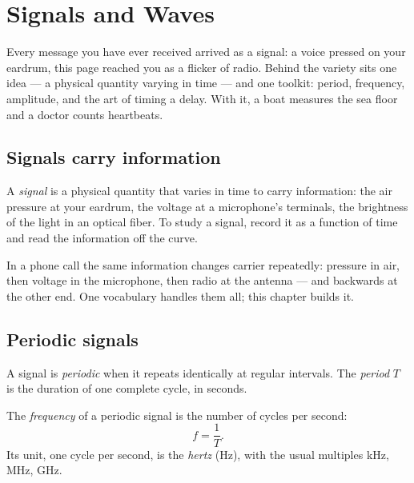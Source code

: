\chapter{Signals and Waves}\label{ch:g10:signals-and-waves}

Every message you have ever received arrived as a signal: a voice pressed
on your eardrum, this page reached you as a flicker of radio. Behind the
variety sits one idea --- a physical quantity varying in time --- and one
toolkit: period, frequency, amplitude, and the art of timing a delay.
With it, a boat measures the sea floor and a doctor counts heartbeats.

\section{Signals carry information}

\begin{definition}[Signal]\label{def:g10:signals-and-waves:signal}
A \emph{signal} is a physical quantity that varies in time
to carry information: the air pressure at your eardrum, the voltage at a
microphone's terminals, the brightness of the light in an optical fiber.
To study a signal, record it as a function of time and read the
information off the curve.
\end{definition}

In a phone call the same information changes carrier repeatedly:
pressure in air, then voltage in the microphone, then radio at the
antenna --- and backwards at the other end. One vocabulary handles them
all; this chapter builds it.

\section{Periodic signals}

\begin{definition}\label{def:g10:signals-and-waves:period}
A signal is \emph{periodic} when it repeats
identically at regular intervals. The \emph{period} $T$ is
the duration of one complete cycle, in seconds.
\end{definition}

\begin{definition}[Frequency]\label{def:g10:signals-and-waves:frequency}
The \emph{frequency} of a periodic signal is the number
of cycles per second:
\[
f = \frac{1}{T} .
\]
Its unit, one cycle per second, is the \emph{hertz}
(\unit{Hz}), with the usual multiples \unit{kHz}, \unit{MHz}, \unit{GHz}.
\end{definition}

